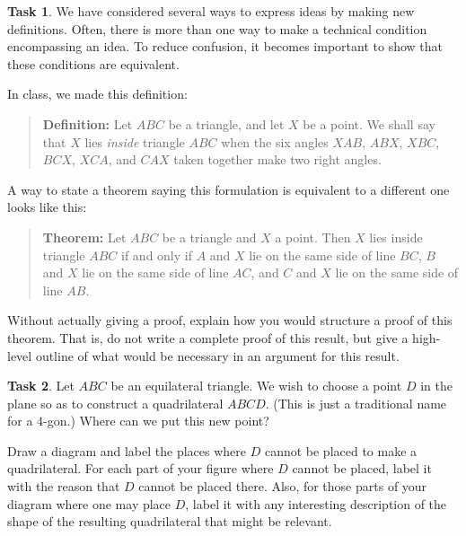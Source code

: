 \documentclass[11pt]{amsart}
\theoremstyle{definition}
\newtheorem{task}{Task}
\begin{document}
\begin{task}\label{biconditional}
We have considered several ways to express ideas by making new definitions.
Often, there is more than one way to make a technical condition encompassing an idea.
To reduce confusion, it becomes important to show that these conditions are equivalent.

In class, we made this definition:
\begin{quote}
\textbf{Definition:} Let $ABC$ be a triangle, and let $X$ be a point. We shall say that $X$ lies \emph{inside} triangle $ABC$ when the six angles $XAB$, $ABX$, $XBC$, $BCX$, $XCA$, and $CAX$ taken together make two right angles.
\end{quote}
A way to state a theorem saying this formulation is equivalent to a different one looks like this:
\begin{quote}
\textbf{Theorem:} Let $ABC$ be a triangle and $X$ a point. Then $X$ lies inside triangle $ABC$ if and only if $A$ and $X$ lie on the same side of line $BC$, $B$ and $X$ lie on the same side of line $AC$, and $C$ and $X$ lie on the same side of line $AB$.
\end{quote}

Without actually giving a proof, explain how you would structure a proof of this theorem.
That is, do not write a complete proof of this result, but give a high-level outline of what would be necessary in an argument for this result.
\end{task}

\begin{task}
Let $ABC$ be an equilateral triangle. We wish to choose a point $D$ in the plane so as to construct a quadrilateral $ABCD$.
(This is just a traditional name for a $4$-gon.)
Where can we put this new point?

Draw a diagram and label the places where $D$ cannot be placed to make a quadrilateral.
For each part of your figure where $D$ cannot be placed, label it with the reason that $D$ cannot be placed there.
Also, for those parts of your diagram where one may place $D$, label it with any interesting description of the shape of the resulting quadrilateral that might be relevant.
\end{task}
\end{document}

